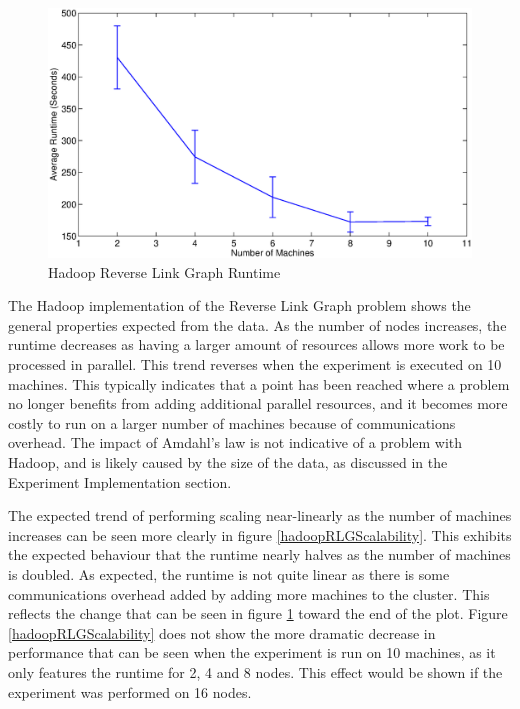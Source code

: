 \begin{figure}[H]
	\centering
	\includegraphics[scale=0.6]{resources/HadoopRLG.eps}
	\caption{Hadoop Reverse Link Graph Runtime}
	\label{hadoopRLGRuntime}
\end{figure}

The Hadoop implementation of the Reverse Link Graph problem shows the general properties expected from the data. As the number of nodes increases, the runtime decreases as having a larger amount of resources allows more work to be processed in parallel. This trend reverses when the experiment is executed on 10 machines. This typically indicates that a point has been reached where a problem no longer benefits from adding additional parallel resources, and it becomes more costly to run on a larger number of machines because of communications overhead. The impact of Amdahl's law \cite{amdahl1967validity} is not indicative of a problem with Hadoop, and is likely caused by the size of the data, as discussed in the Experiment Implementation section.

The expected trend of performing scaling near-linearly as the number of machines increases can be seen more clearly in figure \ref{hadoopRLGScalability}. This exhibits the expected behaviour that the runtime nearly halves as the number of machines is doubled. As expected, the runtime is not quite linear as there is some communications overhead added by adding more machines to the cluster. This reflects the change that can be seen in figure \ref{hadoopRLGRuntime} toward the end of the plot. Figure \ref{hadoopRLGScalability} does not show the more dramatic decrease in performance that can be seen when the experiment is run on 10 machines, as it only features the runtime for 2, 4 and 8 nodes. This effect would be shown if the experiment was performed on 16 nodes.

